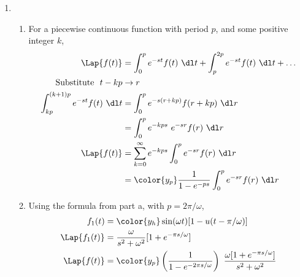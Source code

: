 \begin{enumerate}
    \item \begin{enumerate}
              \item For a piecewise continuous function with period $ p $, and some
                    positive integer $ k $,
                    \begin{align}
                        \Lap\{f(t)\}               & = \int_{0}^{p}
                        e^{-st}f(t)\ \dl t + \int_{p}^{2p} e^{-st}f(t)\ \dl t + \dots \\
                        \text{Substitute }\ t - kp & \to r                            \\
                        \int_{kp}^{(k+1)p} e^{-st}f(t)
                        \ \dl t                    & = \int_{0}^{p}
                        e^{-s(r + kp)} f(r + kp)\ \dl r                               \\
                                                   & = \int_{0}^{p} e^{-kps}
                        \ e^{-sr} f(r)\ \dl r                                         \\
                        \Lap\{f(t)\}               & = \sum_{k = 0}^{\infty}
                        e^{-kps} \int_{0}^{p} e^{-sr}f(r)\ \dl r                      \\
                                                   & = \color{y_p} \frac{1}
                        {1 - e^{-ps}} \int_{0}^{p} e^{-sr}f(r)\ \dl r
                    \end{align}

              \item Using the formula from part a, with $ p = 2\pi / \omega $,
                    \begin{align}
                        f_1(t)         & = \color{y_h} \sin(\omega t)
                        [1 - u(t - \pi / \omega)]                        \\
                        \Lap\{f_1(t)\} & = \frac{\omega}{s^2 + \omega^2}
                        [1 + e^{-\pi s/ \omega}]                         \\
                        \Lap\{f(t)\}   & = \color{y_p} \left( \frac{1}
                        {1 - e^{-2\pi s/ \omega}}\right)\
                        \frac{\omega [1 + e^{-\pi s / \omega}]}{s^2 + \omega^2}
                    \end{align}


\end{enumerate}
\end{enumerate}
